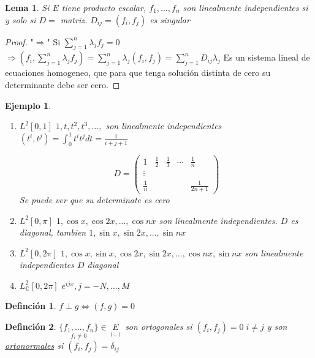 \documentclass[a4paper,10pt]{book}
\newtheorem{lemma}{Lema}
\newtheorem{ejemplo}{Ejemplo}
\newtheorem{definition}{Definción}
\begin{document}
\begin{lemma}
Si $E$ tiene producto escalar, $f_1,...,f_n$ son linealmente independientes si y solo si
$D=$ matriz.  $D_{ij}= (f_i,f_j)$ es singular 
\end{lemma}

\begin{proof}
"$\Rightarrow$"  Si $\sum\limits_{j=1}^n \lambda_jf_j = 0 $   $\Rightarrow (f_i,\sum\limits_{j=1}^n \lambda_jf_j ) = \sum\limits_{j=1}^n \lambda_j (f_i, f_j ) =  \sum\limits_{j=1}^n  D_{ij} \lambda_j$
Es un sistema lineal de ecuaciones homogeneo, que para que tenga solución distinta de cero su determinante debe ser cero.
\end{proof}

\begin{ejemplo}
    \begin{enumerate}
        \item $L^2[0,1]$  $1,t,t^2,t^3,...,$ son linealmente independientes
        $(t^i, t^j)= \int_0^1 t^i t^j dt = \frac{1}{i+j+1}$

        \[
        D= \left( 
        \begin{array}{ccccc}
            1& \frac{1}{2}& \frac{1}{3}& \cdots& \frac{1}{n} \\
            \vdots & & & &\\
            \frac{1}{n} &&& & \frac{1}{2n+1}
        \end{array}
        \right)
        \]
    Se puede ver que su determinate es cero    
    \item $L^2[0,\pi]$  $1,\cos x, \cos 2 x, ..., \cos n x$ son linealmente independientes. $D$ es diagonal,
    tambien $1,\sin x, \sin 2 x,..., \sin n x $ 
    \item $L^2 [0,2\pi]$  $1,\cos x, \sin x, \cos 2x, \sin 2x,..., \cos nx, \sin nx $ son linealmente independientes $D$ diagonal
    \item $L^2_{\mathbb{C}}[0,2 \pi]$   $e^{ijx}, j=-N,...,M$
    
    \end{enumerate}
    
\end{ejemplo}

\begin{definition}
$f \perp g  \Leftrightarrow (f,g) = 0$ 
\end{definition}

\begin{definition}
$\underset{f_i\neq 0}{\{f_1,...,f_n\}}\in \underset{(,)}{E}$ son ortogonales si $(f_i,f_j) = 0 \; i\neq j $ y son \underline{ortonormales} si $(f_i,f_j) = \delta_{ij}$ 
\end{definition}
\end{document}
